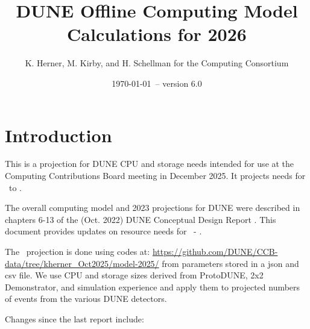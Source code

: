 \documentclass[12pt]{article}
\title{DUNE Offline Computing Model Calculations for 2026}
\author{K. Herner, M. Kirby, and H. Schellman for the Computing Consortium}
\date{\today\ -- version 6.0 }
\newcommand{\csvautotabularright}[2][]{\csvloop{autotabularright={#2},#1}}
\begin{document}
\makeatletter

\maketitle

\tableofcontents
\newpage
\listoftables
\listoffigures

\section{Introduction}

This is a projection for DUNE CPU and storage needs intended for use at the Computing Contributions Board meeting in December 2025. It projects needs for \configRequestYear\ to \configMaxYear. 

The overall computing model  and 2023 projections for DUNE were described in chapters 6-13 of the  (Oct. 2022) DUNE Conceptual Design Report \cite{DUNE:2022fcw}.   This document provides updates on resource needs for \configRequestYear\ - \configMaxYear. 

The \configRequestYear\ projection is done using codes at: \href{https://github.com/DUNE/CCB-data/tree/kherner\_Oct2025/model-2025/}{https://github.com/DUNE/CCB-data/tree/kherner\_Oct2025/model-2025/} from parameters stored in a json and csv file. We use CPU and storage sizes derived from ProtoDUNE, 2x2 Demonstrator, and simulation experience and apply them to projected numbers of events from the various DUNE detectors. 







Changes since the last report \cite{CCB2025, CCB2024Report, CCB2024Minutes} include:
\end{document}
